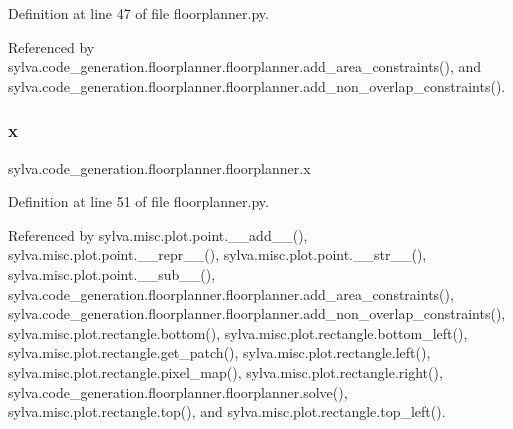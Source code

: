 Definition at line 47 of file floorplanner.\+py.



Referenced by sylva.\+code\+\_\+generation.\+floorplanner.\+floorplanner.\+add\+\_\+area\+\_\+constraints(), and sylva.\+code\+\_\+generation.\+floorplanner.\+floorplanner.\+add\+\_\+non\+\_\+overlap\+\_\+constraints().

\mbox{\label{classsylva_1_1code__generation_1_1floorplanner_1_1floorplanner_a30d871766e220d12a53bce833249cc57}} 
\subsubsection{\texorpdfstring{x}{x}}
{\footnotesize\ttfamily sylva.\+code\+\_\+generation.\+floorplanner.\+floorplanner.\+x}



Definition at line 51 of file floorplanner.\+py.



Referenced by sylva.\+misc.\+plot.\+point.\+\_\+\+\_\+add\+\_\+\+\_\+(), sylva.\+misc.\+plot.\+point.\+\_\+\+\_\+repr\+\_\+\+\_\+(), sylva.\+misc.\+plot.\+point.\+\_\+\+\_\+str\+\_\+\+\_\+(), sylva.\+misc.\+plot.\+point.\+\_\+\+\_\+sub\+\_\+\+\_\+(), sylva.\+code\+\_\+generation.\+floorplanner.\+floorplanner.\+add\+\_\+area\+\_\+constraints(), sylva.\+code\+\_\+generation.\+floorplanner.\+floorplanner.\+add\+\_\+non\+\_\+overlap\+\_\+constraints(), sylva.\+misc.\+plot.\+rectangle.\+bottom(), sylva.\+misc.\+plot.\+rectangle.\+bottom\+\_\+left(), sylva.\+misc.\+plot.\+rectangle.\+get\+\_\+patch(), sylva.\+misc.\+plot.\+rectangle.\+left(), sylva.\+misc.\+plot.\+rectangle.\+pixel\+\_\+map(), sylva.\+misc.\+plot.\+rectangle.\+right(), sylva.\+code\+\_\+generation.\+floorplanner.\+floorplanner.\+solve(), sylva.\+misc.\+plot.\+rectangle.\+top(), and sylva.\+misc.\+plot.\+rectangle.\+top\+\_\+left().

\mbox{\label{classsylva_1_1code__generation_1_1floorplanner_1_1floorplanner_a1b95b56881d41dd6c5e1a66e6a6218cf}} 
